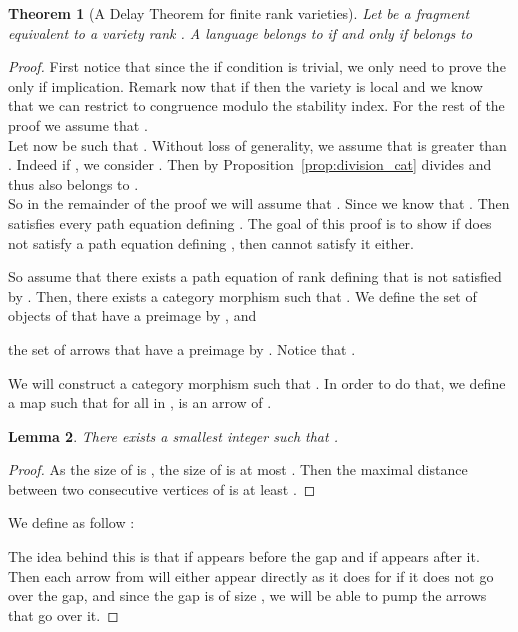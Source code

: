 \documentclass[submission,hidelink]{dmtcs-episciences}
\newtheorem{theorem}{Theorem}
\newtheorem{lemma}[theorem]{Lemma}
\begin{document}
	\begin{theorem}[A  Delay Theorem for finite rank varieties]\label{delay-FinRank}
			Let  be a fragment equivalent to a variety  rank .
			A language  belongs to  if and only if  belongs to
			
		\end{theorem}

		\begin{proof}
	First notice that since the if condition is trivial, we only need to prove the only if implication.
	Remark now that if  then the variety is local and we know that we can restrict to congruence modulo the stability index.
	For the rest of the proof we assume that .\\
	Let now  be such that .
	Without loss of generality, we assume that  is greater than .
	Indeed if , we consider . Then by Proposition~\ref{prop:division_cat}  divides  and thus also belongs to . \\
	 So in the remainder of the proof we will assume that .
	 Since  we know that .
		Then  satisfies every path equation  defining .
	The goal of this proof is to show if  does not satisfy a path equation defining , then  cannot satisfy it either.

		So assume that there exists a path equation  of rank  defining  that is not satisfied by .
		Then, there exists a category morphism 
		such that .
		We define  the set of objects of  that have a preimage by , and
		
		 the set of arrows that have a preimage by .
		Notice that .

		We will construct a category morphism 
		such that .
		In order to do that, we define a map 
		such that for all  in ,  is an arrow of .

		\begin{lemma}
		There exists a smallest integer  such that
		 .
		\end{lemma}
		\begin{proof}
		As the size of  is , the size of  is at most .
		Then the maximal distance between two consecutive vertices of 
		is at least .
		\end{proof}

		We define  as follow :
		
		The idea behind this is that  if  appears before the gap and  if  appears after it.
		Then each arrow from  will either appear directly as it does for  if it does not go over the gap, and since the gap is of size , we will be able to pump the arrows that go over it.


\end{proof}
\end{document}
